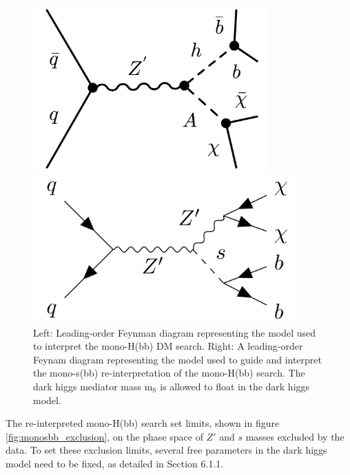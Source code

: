 \documentclass[12pt]{article}
\begin{document}
\begin{figure}[H]
	\centering
	\begin{minipage}[b]{0.45\textwidth}
	\includegraphics[width=0.8\textwidth]{figures/monohbb}
	\end{minipage}
	\begin{minipage}[b]{0.45\textwidth}
	\includegraphics[width=0.9\textwidth]{figures/monosbb}
	\end{minipage}
	\caption[]{Left: Leading-order Feynman diagram representing the model used to interpret the mono-H(bb) DM search. Right: A leading-order Feynam diagram representing the model used to guide and interpret the mono-s(bb) re-interpretation of the mono-H(bb) search. The dark higgs mediator mass m$_\text{S}$ is allowed to float in the dark higgs model.}
	\label{fig:monohbbreinterp}
\end{figure}

The re-interpreted mono-H(bb) search set limits, shown in figure \ref{fig:monosbb_exclusion}, on the phase space of $Z'$ and $s$ masses excluded by the data. To set these exclusion limits, several free parameters in the dark higgs model need to be fixed, as detailed in Section 6.1.1.
%
\end{document}
